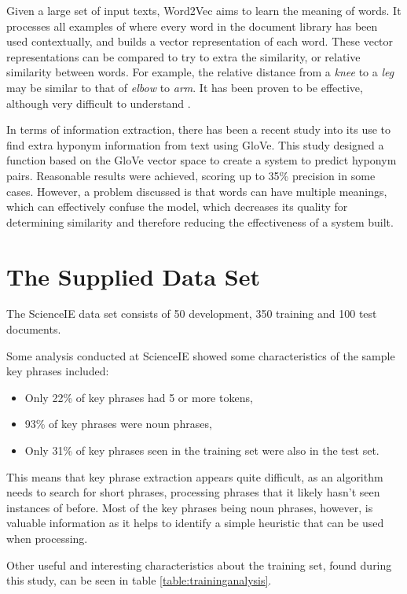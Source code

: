 Given a large set of input texts, Word2Vec aims to learn the meaning of words. It processes all examples of where every word in the document library has been used contextually, and builds a vector representation of each word. These vector representations can be compared to try to extra the similarity, or relative similarity between words. For example, the relative distance from a \textit{knee} to a \textit{leg} may be similar to that of \textit{elbow} to \textit{arm}. It has been proven to be effective, although very difficult to understand \cite{Goldberg2014}. 

In terms of information extraction, there has been a recent study into its use to find extra hyponym information from text \cite{Nayak2015} using GloVe. This study designed a function based on the GloVe vector space to create a system to predict hyponym pairs. Reasonable results were achieved, scoring up to 35\% precision in some cases. However, a problem discussed is that words can have multiple meanings, which can effectively confuse the model, which decreases its quality for determining similarity and therefore reducing the effectiveness of a system built. 

\section{The Supplied Data Set}
The ScienceIE data set consists of 50 development, 350 training and 100 test documents. 

Some analysis conducted at ScienceIE \cite{Augenstein2017} showed some characteristics of the sample key phrases included:
\begin{itemize}
	\item Only 22\% of key phrases had 5 or more tokens,
	\item 93\% of key phrases were noun phrases,
	\item Only 31\% of key phrases seen in the training set were also in the test set.
\end{itemize}

This means that key phrase extraction appears quite difficult, as an algorithm needs to search for short phrases, processing phrases that it likely hasn't seen instances of before. Most of the key phrases being noun phrases, however, is valuable information as it helps to identify a simple heuristic that can be used when processing.

Other useful and interesting characteristics about the training set, found during this study, can be seen in table \ref{table:traininganalysis}. 

